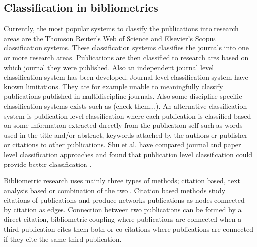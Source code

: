 \subsection{Classification in bibliometrics}
Currently, the most popular systems to classify the publications 
into research areas are the Thomson 
Reuter's Web of Science and Elsevier's Scopus classification
systems. These classification systems classifies the journals into
one or more research areas. \cite{waltman_new_2012} Publications
are then classified to research ares based on which journal they
were published. 
Also an independent journal level classification system has been 
developed. \cite{archambault_towards_2011}
Journal level classification system have known limitations.
They are for example unable to meaningfully classify publications 
published in multidiscipline journals. 
Also some discipline specific classification systems exists such 
as (check them...).
An alternative classification system is publication level 
classification where each publication is classified based on some 
information extracted directly from the publication self such as
words used in the title and/or abstract, keywords attached by the
authors or publisher or citations to other publications.
Shu et al. have compared journal and paper level classification
approaches and found that publication level classification could
provide better classification \cite{shu_comparing_2019}.

Bibliometric research 
uses mainly three types of methods; citation based, text analysis 
based or combination of the two \cite{janssens_hybrid_2009}.
Citation based methods study citations of publications and produce
networks publications as nodes connected by citation as edges.
Connection between two publications can be 
formed by a direct citation, bibliometric coupling where 
publications are connected when a third publication cites them 
both or co-citations where publications are connected if they 
cite the same third publication.

